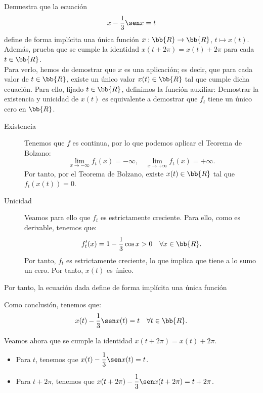 \documentclass[12pt]{article}
\begin{document}
\begin{ejercicio}
    Demuestra que la ecuación
    \[
        x - \dfrac{1}{3} \sen x = t
    \]
    define de forma implícita una única función \(x : \bb{R} \to \bb{R}\), \(t \mapsto x(t)\). Además, prueba que se cumple la identidad \(x(t + 2\pi) = x(t) + 2\pi\) para cada \(t \in \bb{R}\).\\

    Para verlo, hemos de demostrar que $x$ es una aplicación; es decir, que para cada valor de $t\in \bb{R}$, existe un único valor $x(t)\in \bb{R}$ tal que cumple dicha ecuación.
    Para ello, fijado $t\in \bb{R}$, definimos la función auxiliar:
    Demostrar la existencia y unicidad de $x(t)$ es equivalente a demostrar que $f_t$ tiene un único cero en $\bb{R}$.
    \begin{description}
        \item[Existencia] Tenemos que $f$ es continua, por lo que podemos aplicar el Teorema de Bolzano:
        \begin{equation*}
            \lim_{x\to -\infty} f_t(x) = -\infty, \quad \lim_{x\to +\infty} f_t(x) = +\infty.
        \end{equation*}
        Por tanto, por el Teorema de Bolzano, existe $x(t)\in \bb{R}$ tal que $f_t(x(t)) = 0$.

        \item[Unicidad] Veamos para ello que $f_t$ es estrictamente creciente. Para ello, como es derivable, tenemos que:
        \begin{equation*}
            f_t'(x) = 1 - \dfrac{1}{3} \cos x > 0 \quad \forall x\in \bb{R}.
        \end{equation*}
        Por tanto, $f_t$ es estrictamente creciente, lo que implica que tiene a lo sumo un cero. Por tanto, $x(t)$ es único.
    \end{description}

    Por tanto, la ecuación dada define de forma implícita una única función

    Como conclusión, tenemos que:
    \begin{equation*}
        x(t)-\dfrac{1}{3}\sen x(t) = t \quad \forall t\in \bb{R}.
    \end{equation*}

    Veamos ahora que se cumple la identidad $x(t + 2\pi) = x(t) + 2\pi$.
    \begin{itemize}
        \item Para $t$, tenemos que $x(t)-\dfrac{1}{3}\sen x(t) = t$.
        \item Para $t+2\pi$, tenemos que $x(t+2\pi)-\dfrac{1}{3}\sen x(t+2\pi) = t+2\pi$.
    \end{itemize}


\end{ejercicio}
\end{document}
